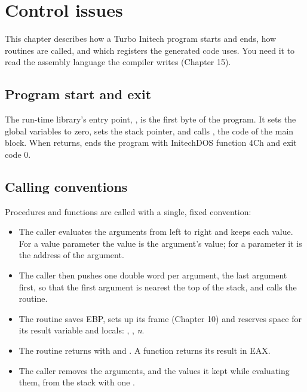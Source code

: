 \chapter{Control issues}

This chapter describes how a Turbo Initech program starts and ends, how
routines are called, and which registers the generated code uses.  You need
it to read the assembly language the compiler writes (Chapter 15).

\section{Program start and exit}
The run-time library's entry point, , is the first byte of
the program.  It sets the global variables to zero, sets the stack
pointer, and calls , the code of the main block.  When
 returns,  ends the program with InitechDOS
function 4Ch and exit code 0.

\section{Calling conventions}
Procedures and functions are called with a single, fixed convention:

\begin{itemize}
\item The caller evaluates the arguments from left to right and keeps each
  value.  For a value parameter the value is the argument's value; for a
   parameter it is the address of the argument.
\item The caller then pushes one double word per argument, the last argument
  first, so that the first argument is nearest the top of the stack, and
  calls the routine.
\item The routine saves EBP, sets up its frame (Chapter 10) and reserves
  space for its result variable and locals:
  , , \textit{n}.
\item The routine returns with  and .  A function
  returns its result in EAX.
\item The caller removes the arguments, and the values it kept while
  evaluating them, from the stack with one .
\end{itemize}


